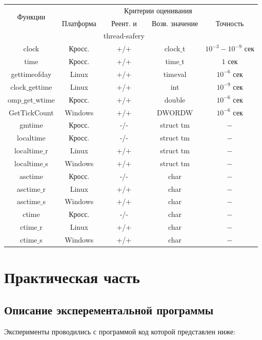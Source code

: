 \documentclass{article}
\begin{document}
			\begin{table}
			\begin{tabular}{|c|c|c|c|c|} 
			\hline
			\multirow{2}{*}{Функции} & \multicolumn{4}{|c|}{ Критерии оценивания	}\\
			\cline{2-5}
			\qquad & Платформа & Реент. и  		   & Возв. значение & Точность					\\
			\qquad &\qquad     & thread-safery	   & \qquad 		& \qquad					\\
			\hline
			clock				& Кросс. 	 & +/+ & clock$\_$t 	&	$10^{-3} - 10^{-9}$ сек	\\
			time				& Кросс. 	 & +/+ & time$\_$t	 	&	$1$ сек					\\
			gettimeofday		& Linux 	 & +/+ & timeval		&	$10^{-6}$ сек			\\
			clock$\_$gettime	& Linux 	 & +/+ & int			&	$10^{-9}$ сек			\\
			omp$\_$get$\_$wtime	& Кросс. 	 & +/+ & double			&	$10^{-6}$ сек			\\
			GetTickCount		& Windows 	 & +/+ & DWORDW			& 	$10^{-6}$ сек			\\
			gmtime				& Кросс. 	 & -/- & struct tm 		&	$-$						\\
			localtime 			& Кросс. 	 & -/- & struct tm 		&	$-$						\\
			localtime$\_$r		& Linux 	 & +/+ & struct tm 		&	$-$						\\
			localtime$\_$s		& Windows 	 & +/+ & struct tm 		&	$-$						\\
			asctime		 		& Кросс. 	 & -/- & char	 		&	$-$						\\
			asctime$\_$r 		& Linux 	 & +/+ & char	 		&	$-$						\\
			asctime$\_$s 		& Windows 	 & +/+ & char	 		&	$-$						\\
			ctime				& Кросс. 	 & -/- & char 			&	$-$						\\
			ctime$\_$r			& Linux 	 & +/+ & char 			&	$-$						\\
			ctime$\_$s			& Windows 	 & +/+ & char			&	$-$						\\
			\hline
			\end{tabular}		
		\end{table}	
			
	\newpage
	\section{Практическая часть}
		\subsection{Описание эксперементальной программы}
			Эксперименты проводились с программой код которой представлен ниже:
			
\end{document}
